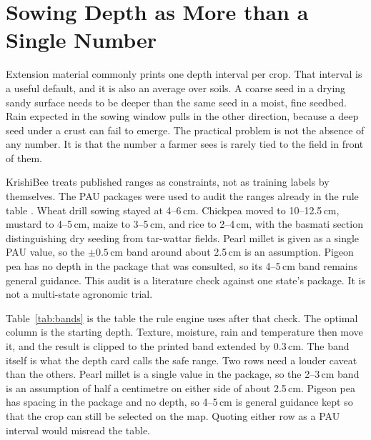 \label{ch:lit}

\section{Sowing Depth as More than a Single Number}
Extension material commonly prints one depth interval per crop. That interval is a useful default, and it is also an average over soils. A coarse seed in a drying sandy surface needs to be deeper than the same seed in a moist, fine seedbed. Rain expected in the sowing window pulls in the other direction, because a deep seed under a crust can fail to emerge. The practical problem is not the absence of any number. It is that the number a farmer sees is rarely tied to the field in front of them.

KrishiBee treats published ranges as constraints, not as training labels by themselves. The PAU packages were used to audit the ranges already in the rule table \cite{pau2025rabi,pau2026kharif}. Wheat drill sowing stayed at 4--6\,cm. Chickpea moved to 10--12.5\,cm, mustard to 4--5\,cm, maize to 3--5\,cm, and rice to 2--4\,cm, with the basmati section distinguishing dry seeding from tar-wattar fields. Pearl millet is given as a single PAU value, so the $\pm 0.5$\,cm band around about 2.5\,cm is an assumption. Pigeon pea has no depth in the package that was consulted, so its 4--5\,cm band remains general guidance. This audit is a literature check against one state's package. It is not a multi-state agronomic trial.

Table~\ref{tab:bands} is the table the rule engine uses after that check. The optimal column is the starting depth. Texture, moisture, rain and temperature then move it, and the result is clipped to the printed band extended by 0.3\,cm. The band itself is what the depth card calls the safe range. Two rows need a louder caveat than the others. Pearl millet is a single value in the package, so the 2--3\,cm band is an assumption of half a centimetre on either side of about 2.5\,cm. Pigeon pea has spacing in the package and no depth, so 4--5\,cm is general guidance kept so that the crop can still be selected on the map. Quoting either row as a PAU interval would misread the table.

